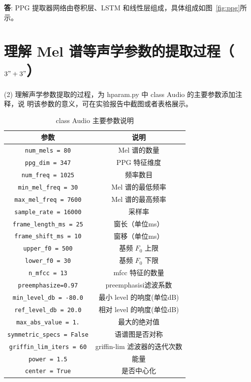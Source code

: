 \documentclass[degree=project,degree-type=project,cjk-font=noto]{thuthesis}
\begin{document}
\textbf{答}: PPG 提取器网络由卷积层、LSTM 和线性层组成，具体组成如图~\ref{fig:ppg}所示。

\section{理解 Mel 谱等声学参数的提取过程（$3" + 3"$）}

(2) 理解声学参数提取的过程，为 hparam.py 中 class Audio 的主要参数添加注释，说
明该参数的意义，可在实验报告中截图或者表格展示。

\begin{table}[htb]
  \centering
  \caption{class Audio 主要参数说明}
  \label{tab:audio_param}
  \begin{tabular}{cc}
    \toprule
    \textbf{参数}         & \textbf{说明}  \\
    \midrule
    \texttt{num\_mels = 80} & Mel 谱的数量\\
    \texttt{ppg\_dim = 347} & PPG 特征维度 \\
    \texttt{num\_freq = 1025} & 频率数目 \\
    \texttt{min\_mel\_freq = 30} & Mel 谱的最低频率 \\
    \texttt{max\_mel\_freq = 7600} & Mel 谱的最高频率 \\
    \texttt{sample\_rate = 16000} & 采样率 \\
    \texttt{frame\_length\_ms = 25} & 窗长（单位ms） \\
    \texttt{frame\_shift\_ms = 10} & 窗移（单位ms） \\
    \texttt{upper\_f0 = 500} & 基频 $F_0$ 上限 \\
    \texttt{lower\_f0 = 30} & 基频 $F_0$ 下限 \\
    \midrule
    \texttt{n\_mfcc = 13} & mfcc 特征的数量 \\
    \texttt{preemphasize=0.97} & preemphasisi滤波系数 \\
    \texttt{min\_level\_db = -80.0} & 最小 level 的响度(单位dB) \\
    \texttt{ref\_level\_db = 20.0} & 相对 level 的响度(单位dB) \\
    \texttt{max\_abs\_value = 1.} & 最大的绝对值 \\
    \texttt{symmetric\_specs = False} & 语谱图是否对称 \\
    \texttt{griffin\_lim\_iters = 60} & griffin-lim 滤波器的迭代次数 \\
    \texttt{power = 1.5} & 能量 \\
    \texttt{center = True} & 是否中心化 \\
    \bottomrule
  \end{tabular}
\end{table}
\end{document}
